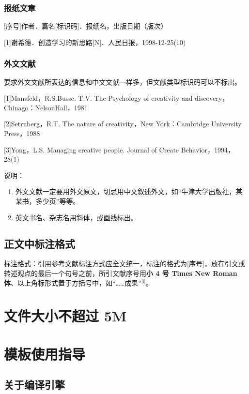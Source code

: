 \documentclass{buaa_fengru}
\begin{document}
\subsubsection{报纸文章}

[序号]作者．篇名[标识码]．报纸名，出版日期（版次）

[1]谢希德．创造学习的新思路[N]．人民日报，1998-12-25(10)

\subsubsection{外文文献}

要求外文文献所表达的信息和中文文献一样多，但文献类型标识码可以不标出。

[1]Mansfeld，R.S.Busse. T.V. The Psychology of creativity and discovery，Chinago：NelsonHall，1981

[2]Setrnberg，R.T. The nature of creativity，New York：Cambridge University Press，1988

[3]Yong，L.S. Managing creative people. Journal of Create Behavior，1994，28(1)

说明：

\begin{enumerate}[nosep]
    \item 外文文献一定要用外文原文，切忌用中文叙述外文，如“牛津大学出版社，某某书，多少页”等等。
    \item 英文书名、杂志名用斜体，或画线标出。
\end{enumerate}

\subsection{正文中标注格式}

标注格式：引用参考文献标注方式应全文统一，标注的格式为[序号]，放在引文或转述观点的最后一个句号之前，所引文献序号用\textbf{小 4 号 Times New Roman 体}、以上角标形式置于方括号中，如“……成果”$^{\text{[i]}}$。

\section{文件大小不超过 5M}

\section{模板使用指导}

\subsection{关于编译引擎}
\end{document}
